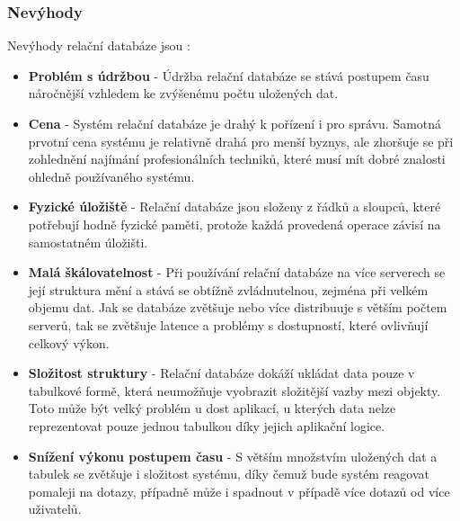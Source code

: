 \subsubsection{Nevýhody}
Nevýhody relační databáze jsou \cite{advantages_relational}:
\begin{itemize}
\item \textbf{Problém s údržbou} -  Údržba relační databáze se stává postupem času náročnější vzhledem ke zvýšenému počtu uložených dat.
\item \textbf{Cena} - Systém relační databáze je drahý k pořízení i pro správu. Samotná prvotní cena systému je relativně drahá pro menší byznys, ale zhoršuje se při zohlednění najímání profesionálních techniků, které musí mít dobré znalosti ohledně používaného systému.
\item \textbf{Fyzické úložiště} - Relační databáze jsou složeny z řádků a sloupců, které potřebují hodně fyzické paměti, protože každá provedená operace závisí na samostatném úložišti. 
\item \textbf{Malá škálovatelnost} - Při používání relační databáze na více serverech se její struktura mění a stává se obtížně zvládnutelnou, zejména při velkém objemu dat. Jak se databáze zvětšuje nebo více distribuuje s větším počtem serverů, tak se zvětšuje latence a problémy s dostupností, které ovlivňují celkový výkon.
\item \textbf{Složitost struktury} - Relační databáze dokáží ukládat data pouze v tabulkové formě, která neumožňuje vyobrazit složitější vazby mezi objekty. Toto může být velký problém u dost aplikací, u kterých data nelze reprezentovat pouze jednou tabulkou díky jejich aplikační logice.
\item \textbf{Snížení výkonu postupem času} - S větším množstvím uložených dat a tabulek se zvětšuje i složitost systému, díky čemuž bude systém reagovat pomaleji na dotazy, případně může i spadnout v případě více dotazů od více uživatelů.
\end{itemize}

